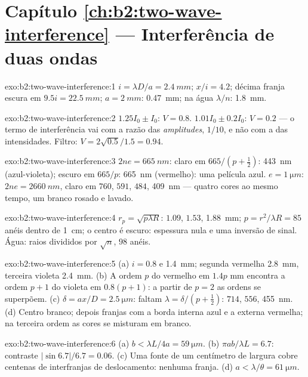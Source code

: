 \section*{Capítulo \ref{ch:b2:two-wave-interference} --- Interferência de duas ondas}

\begin{solution}{exo:b2:two-wave-interference:1}
$i = \lambda D/a = \qty{2.4}{mm}$; $x/i = 4.2$; décima franja escura em $9.5i = \qty{22.5}{mm}$;
$a = \qty{2}{mm}$: \qty{0.47}{mm}; na água $\lambda/n$: \qty{1.8}{mm}.
\end{solution}

\begin{solution}{exo:b2:two-wave-interference:2}
$1.25I_0 \pm I_0$: $V = 0.8$. $1.01I_0 \pm 0.2I_0$: $V = 0.2$ --- o termo de interferência
vai com a razão das \emph{amplitudes}, $1/10$, e não com a das intensidades. Filtro:
$V = 2\sqrt{0.5}/1.5 = 0.94$.
\end{solution}

\begin{solution}{exo:b2:two-wave-interference:3}
$2ne = \qty{665}{nm}$: claro em $665/(p + \tfrac12)$: \qty{443}{nm} (azul-violeta);
escuro em $665/p$: \qty{665}{nm} (vermelho): uma película azul. $e = \qty{1}{\micro m}$: $2ne = \qty{2660}{nm}$,
claro em $760$, $591$, $484$, \qty{409}{nm} --- quatro cores ao mesmo tempo, um
branco rosado e lavado.
\end{solution}

\begin{solution}{exo:b2:two-wave-interference:4}
$r_p = \sqrt{p\lambda R}$: $1.09$, $1.53$, \qty{1.88}{mm}; $p = r^2/\lambda R = 85$ anéis dentro de
\qty{1}{cm}; o centro é escuro: espessura nula e uma inversão de sinal. Água:
raios divididos por $\sqrt n$, $98$ anéis.
\end{solution}

\begin{solution}{exo:b2:two-wave-interference:5}
(a) $i = 0.8$ e \qty{1.4}{mm}; segunda vermelha \qty{2.8}{mm}, terceira violeta \qty{2.4}{mm}.
(b) A ordem $p$ do vermelho em $1.4p$ mm encontra a ordem $p + 1$ do violeta em $0.8(p + 1)$: a partir de
$p = 2$ as ordens se superpõem. (c) $\delta = ax/D = \qty{2.5}{\micro m}$: faltam $\lambda = \delta/(p +
\tfrac12)$: $714$, $556$, \qty{455}{nm}. (d) Centro branco; depois franjas com a
borda interna azul e a externa vermelha; na terceira ordem as cores
se misturam em branco.
\end{solution}

\begin{solution}{exo:b2:two-wave-interference:6}
(a) $b < \lambda L/4a = \qty{59}{\micro m}$. (b) $\pi ab/\lambda L = 6.7$: contraste $|\sin6.7|/6.7
= 0.06$. (c) Uma fonte de um centímetro de largura cobre centenas de interfranjas de
deslocamento: nenhuma franja. (d) $a < \lambda/\theta = \qty{61}{\micro m}$.
\end{solution}

